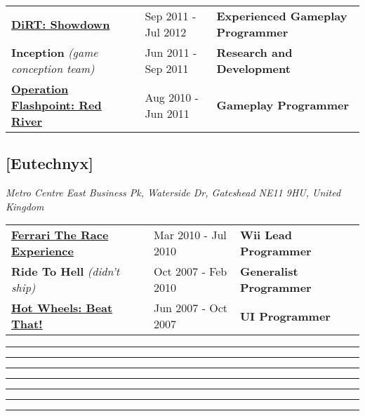 \documentclass[a4paper]{res}
\newcommand{\setrule}[1]{\rule{#1}{1mm}}
\newcommand{\fibrule}[2]{ \hspace{#1}  \setrule{#2} \setrule{21mm} \setrule{13mm} \setrule{8mm} \setrule{5mm} \setrule{3mm} \setrule{2mm}  \vspace{-.52in} }
\begin{document}
\begin{resume}
\begin{tabular}{| l | l@{\hskip .12in} | l }
\href{http://nathanrosspowell.com/games/dirt-showdown/}{\bf DiRT: Showdown }                                                   & Sep 2011 - Jul 2012     &  {\bf Experienced Gameplay Programmer} \\
{\bf Inception } \textit{(game conception team)}                                                                                                         & Jun 2011 - Sep 2011     &{\bf Research and Development} \\
\href{http://nathanrosspowell.com/games/operation-flashpoint-red-river/}{\bf Operation Flashpoint: Red River }  & Aug 2010 - Jun 2011     & {\bf Gameplay Programmer} \\

\end{tabular}
\vspace{-.3in}

\subsection{[Eutechnyx]}\textit{Metro Centre East Business Pk, Waterside Dr, Gateshead NE11 9HU, United Kingdom}

\vspace{-.15in}
\begin{tabular}{| l@{\hskip .39in} | l@{\hskip .14in} | l }

\href{http://nathanrosspowell.com/games/ferrari-the-race-experience/}{\bf Ferrari The Race Experience} &  Mar 2010 - Jul 2010      & {\bf Wii Lead Programmer}\\
{\bf Ride To Hell} \textit{(didn't ship)}                                                                                                                & Oct 2007 -  Feb 2010     & {\bf Generalist Programmer} \\
\href{http://nathanrosspowell.com/games/hot-wheels-beat-that/}{\bf Hot Wheels: Beat That!}                  & Jun 2007 - Oct 2007      & {\bf  UI Programmer} \\

\end{tabular}

\vspace{.15in}

\fibrule{0.9in}{3.0in}

\end{resume}
\end{document}
